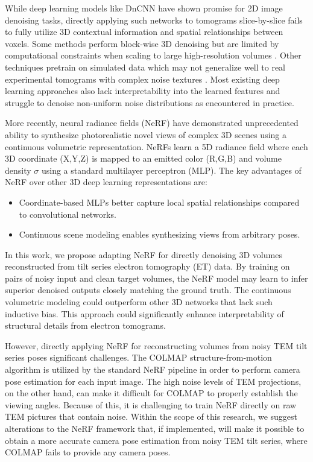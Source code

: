 \vspace{10pt}

While deep learning models like DnCNN \cite{Chen2017} have shown promise for 2D image denoising tasks, directly applying such networks to tomograms slice-by-slice fails to fully utilize 3D contextual information and spatial relationships between voxels. Some methods perform block-wise 3D denoising but are limited by computational constraints when scaling to large high-resolution volumes \cite{Xin2020}. Other techniques pretrain on simulated data which may not generalize well to real experimental tomograms with complex noise textures \cite{Xin2020}. Most existing deep learning approaches also lack interpretability into the learned features and struggle to denoise non-uniform noise distributions as encountered in practice.

\vspace{10pt}

More recently, neural radiance fields (NeRF) \cite{Mildenhall2020} have demonstrated unprecedented ability to synthesize photorealistic novel views of complex 3D scenes using a continuous volumetric representation. NeRFs learn a 5D radiance field where each 3D coordinate (X,Y,Z) is mapped to an emitted color (R,G,B) and volume density $\sigma$ using a standard multilayer perceptron (MLP). The key advantages of NeRF over other 3D deep learning representations are:

\begin{itemize}
\item  Coordinate-based MLPs better capture local spatial relationships compared to convolutional networks.
\item Continuous scene modeling enables synthesizing views from arbitrary poses.
\end{itemize}

In this work, we propose adapting NeRF for directly denoising 3D volumes reconstructed from tilt series electron tomography (ET) data. By training on pairs of noisy input and clean target volumes, the NeRF model may learn to infer superior denoised outputs closely matching the ground truth. The continuous volumetric modeling could outperform other 3D networks that lack such inductive bias. This approach could significantly enhance interpretability of structural details from electron tomograms.

\vspace{10pt}
However, directly applying NeRF for reconstructing volumes from noisy TEM tilt series poses significant challenges. The COLMAP structure-from-motion algorithm is utilized by the standard NeRF pipeline in order to perform camera pose estimation for each input image. The high noise levels of TEM projections, on the other hand, can make it difficult for COLMAP to properly establish the viewing angles. Because of this, it is challenging to train NeRF directly on raw TEM pictures that contain noise. Within the scope of this research, we suggest alterations to the NeRF framework that, if implemented, will make it possible to obtain a more accurate camera pose estimation from noisy TEM tilt series, where COLMAP fails to provide any camera poses. 

